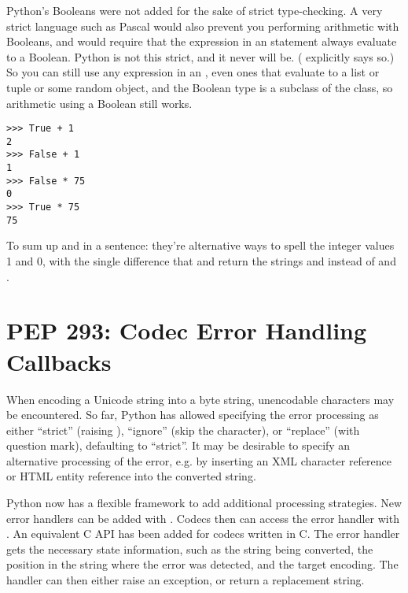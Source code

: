 \documentclass{howto}
\begin{document}
Python's Booleans were not added for the sake of strict type-checking.
A very strict language such as Pascal would also prevent you
performing arithmetic with Booleans, and would require that the
expression in an  statement always evaluate to a Boolean.
Python is not this strict, and it never will be.  (
explicitly says so.)  So you can still use any expression in an
, even ones that evaluate to a list or tuple or some
random object, and the Boolean type is a subclass of the
 class, so arithmetic using a Boolean still works.

\begin{verbatim}
>>> True + 1
2
>>> False + 1
1
>>> False * 75
0
>>> True * 75
75
\end{verbatim}

To sum up  and  in a sentence: they're
alternative ways to spell the integer values 1 and 0, with the single
difference that  and  return the
strings  and  instead of  and .

\begin{seealso}


\end{seealso}


\section{PEP 293: Codec Error Handling Callbacks}

When encoding a Unicode string into a byte string, unencodable
characters may be encountered.  So far, Python has allowed specifying
the error processing as either ``strict'' (raising
), ``ignore'' (skip the character), or
``replace'' (with question mark), defaulting to ``strict''. It may be
desirable to specify an alternative processing of the error, e.g. by
inserting an XML character reference or HTML entity reference into the
converted string.

Python now has a flexible framework to add additional processing
strategies.  New error handlers can be added with
. Codecs then can access the error
handler with . An equivalent C API has
been added for codecs written in C. The error handler gets the
necessary state information, such as the string being converted, the
position in the string where the error was detected, and the target
encoding.  The handler can then either raise an exception, or return a
replacement string.
\end{document}
